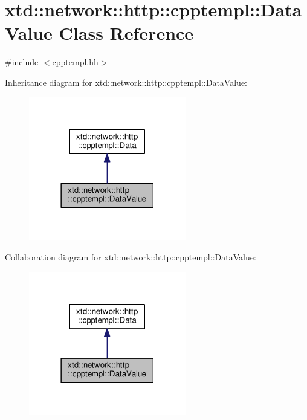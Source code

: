 \hypertarget{classxtd_1_1network_1_1http_1_1cpptempl_1_1DataValue}{}\section{xtd\+:\+:network\+:\+:http\+:\+:cpptempl\+:\+:Data\+Value Class Reference}
\label{classxtd_1_1network_1_1http_1_1cpptempl_1_1DataValue}


{\ttfamily \#include $<$cpptempl.\+hh$>$}



Inheritance diagram for xtd\+:\+:network\+:\+:http\+:\+:cpptempl\+:\+:Data\+Value\+:
\nopagebreak
\begin{figure}[H]
\begin{center}
\leavevmode
\includegraphics[width=194pt]{classxtd_1_1network_1_1http_1_1cpptempl_1_1DataValue__inherit__graph}
\end{center}
\end{figure}


Collaboration diagram for xtd\+:\+:network\+:\+:http\+:\+:cpptempl\+:\+:Data\+Value\+:
\nopagebreak
\begin{figure}[H]
\begin{center}
\leavevmode
\includegraphics[width=194pt]{classxtd_1_1network_1_1http_1_1cpptempl_1_1DataValue__coll__graph}
\end{center}
\end{figure}
